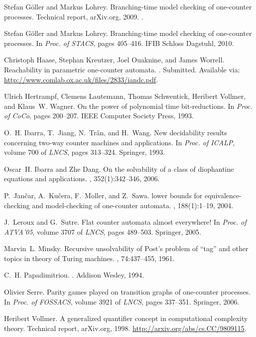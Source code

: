 \documentclass[times,envcountsame]{llncs}
\begin{document}
\begin{thebibliography}{10}
Stefan G{\"o}ller and Markus Lohrey.
\newblock Branching-time model checking of one-counter processes.
\newblock Technical report, arXiv.org, 2009.
.

Stefan G{\"o}ller and Markus Lohrey.
\newblock Branching-time model checking of one-counter processes.
\newblock In {\em Proc. of STACS}, pages 405--416. IFIB Schloss Dagstuhl, 2010.

Christoph Haase, Stephan Kreutzer, Joel Ouaknine, and James Worrell.
\newblock Reachability in parametric one-counter automata.
.
\newblock Submitted. Available via:\\
  \url{http://www.comlab.ox.ac.uk/files/2833/iandc.pdf}.

Ulrich Hertrampf, Clemens Lautemann, Thomas Schwentick, Heribert Vollmer, and
  Klaus~W. Wagner.
\newblock On the power of polynomial time bit-reductions.
\newblock In {\em Proc. of CoCo}, pages 200--207. IEEE Computer Society Press, 1993.

O.~H. Ibarra, T.~Jiang, N.~Tr{\^a}n, and H.~Wang.
\newblock New decidability results concerning two-way counter machines and
  applications.
\newblock In {\em Proc. of ICALP}, volume 700 of {\em LNCS}, pages 313--324. Springer, 1993.

Oscar~H. Ibarra and Zhe Dang.
\newblock On the solvability of a class of diophantine equations and
  applications.
, 352(1):342--346, 2006.

P.~Jan\v{c}ar, A.~Ku\v{c}era, F.~Moller, and Z.~Sawa.
 lower bounds for equivalence-checking and model-checking of
  one-counter automata.
, 188(1):1--19, 2004.

J.~Leroux and G.~Sutre.
\newblock Flat counter automata almost everywhere!
\newblock In {\em Proc. of {ATVA}'05}, volume 3707 of {\em LNCS}, pages 489--503. Springer, 2005.

Marvin~L. Minsky.
\newblock Recursive unsolvability of {P}ost's problem of ``tag'' and other
  topics in theory of {T}uring machines.
, 74:437--455, 1961.

C.~H. Papadimitriou.
.
\newblock Addison Wesley, 1994.

Olivier Serre.
\newblock Parity games played on transition graphs of one-counter processes.
\newblock In  {\em Proc. of FOSSACS}, volume 3921 of {\em LNCS}, pages 337--351. Springer, 2006.

Heribert Vollmer.
\newblock A generalized quantifier concept in computational complexity theory.
\newblock Technical report, arXiv.org, 1998.
\newblock \url{http://arxiv.org/abs/cs.CC/9809115}.

\end{thebibliography}
\end{document}
